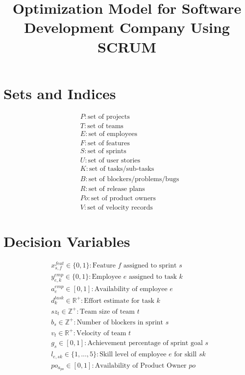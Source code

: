\documentclass{article}
\begin{document}
\title{Optimization Model for Software Development Company Using SCRUM}
\author{}
\date{}
\maketitle

\section*{Sets and Indices}
\begin{align*}
&P: \text{set of projects} \\
&T: \text{set of teams} \\
&E: \text{set of employees} \\
&F: \text{set of features} \\
&S: \text{set of sprints} \\
&U: \text{set of user stories} \\
&K: \text{set of tasks/sub-tasks} \\
&B: \text{set of blockers/problems/bugs} \\
&R: \text{set of release plans} \\
&Po: \text{set of product owners} \\
&V: \text{set of velocity records}
\end{align*}

\section*{Decision Variables}
\begin{align*}
&x^{feat}_{s,f} \in \{0,1\}: \text{Feature } f \text{ assigned to sprint } s \\
&y^{emp}_{e,k} \in \{0,1\}: \text{Employee } e \text{ assigned to task } k \\
&a^{emp}_e \in [0,1]: \text{Availability of employee } e \\
&d^{task}_k \in \mathbb{R}^+: \text{Effort estimate for task } k \\
&sz_t \in \mathbb{Z}^+: \text{Team size of team } t \\
&b_{s} \in \mathbb{Z}^+: \text{Number of blockers in sprint } s \\
&v_t \in \mathbb{R}^+: \text{Velocity of team } t \\
&g_s \in [0,1]: \text{Achievement percentage of sprint goal } s \\
&l_{e,sk} \in \{1,...,5\}: \text{Skill level of employee } e \text{ for skill } sk \\
&po_a_{po} \in [0,1]: \text{Availability of Product Owner } po
\end{align*}
\end{document}
